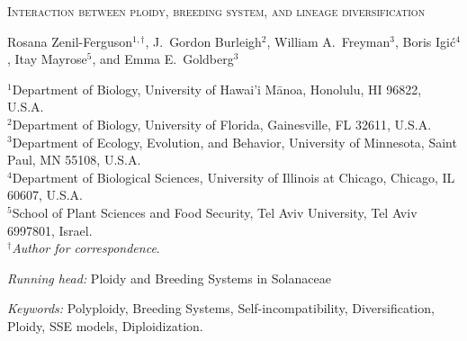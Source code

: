 \documentclass[11pt]{article}
\begin{document}


%
\begin{center}
    \textsc{Interaction between ploidy, breeding system, and lineage diversification}

\vfill

\noindent 
Rosana Zenil-Ferguson$^{1,\dagger}$,
%
J.~Gordon Burleigh$^{2}$,
%
William A.~Freyman$^{3}$,
%
Boris Igi\'c$^{4}$,
%
Itay Mayrose$^{5}$,
%
and Emma E.~Goldberg$^{3}$
%
\end{center}
%
\noindent$^{1}$Department of Biology, University of Hawai'i M\={a}noa, Honolulu, HI 96822, U.S.A.\\
%
\noindent$^{2}$Department of Biology, University of Florida, Gainesville, FL 32611, U.S.A.\\
%
\noindent$^{3}$Department of Ecology, Evolution, and Behavior, University of Minnesota, Saint Paul, MN 55108, U.S.A.\\
%
\noindent$^{4}$Department of Biological Sciences, University of Illinois at Chicago, Chicago, IL 60607, U.S.A. \\
%
\noindent$^{5}$School of Plant Sciences and Food Security, Tel Aviv University, Tel Aviv 6997801, Israel.\\
%
\noindent$^\dagger$\textit{Author for correspondence}.\\

\vfill

\noindent\textit{Running head:} 
Ploidy and Breeding Systems in Solanaceae

\noindent \textit{Keywords:} 
Polyploidy,
Breeding Systems,
Self-incompatibility,
Diversification, 
Ploidy,
SSE models,
Diploidization.

\vfill

\linenumbers


\clearpage



\clearpage




\end{document}
